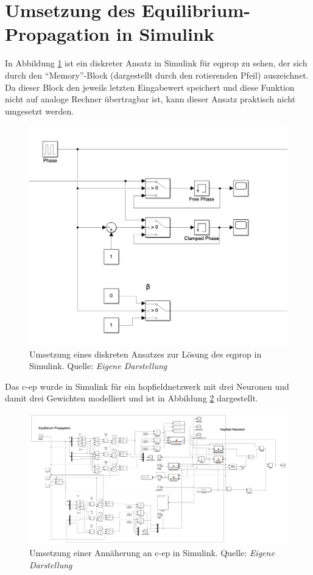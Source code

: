 \section{Umsetzung des Equilibrium-Propagation in Simulink}
\label{app:Umsetzung des Equilibrium-Propagation in Simulink}

In Abbildung \ref{fig:EqProp Discrete Simulink} ist ein diskreter Ansatz in Simulink für \gls{eqprop} zu sehen, der sich durch den "`Memory"'-Block (dargestellt durch den rotierenden Pfeil) auszeichnet. Da dieser Block den jeweils letzten Eingabewert speichert und diese Funktion nicht auf analoge Rechner übertragbar ist, kann dieser Ansatz praktisch nicht umgesetzt werden.

\begin{figure}[h]
  \includegraphics[width=\textwidth]{abbildungen/ep_discrete_simulink.png}
  \caption{Umsetzung eines diskreten Ansatzes zur Lösung des \gls{eqprop} in Simulink. Quelle: \textit{Eigene Darstellung}}
  \label{fig:EqProp Discrete Simulink}
\end{figure}

Das \gls{c-ep} wurde in Simulink für ein \gls{hopfieldnetzwerk} mit drei Neuronen und damit drei Gewichten modelliert und ist in Abbildung \ref{fig:C-EP Simulink} dargestellt.

\begin{figure}[h]
  \includegraphics[width=\textwidth]{abbildungen/c-ep_simulink.png}
  \caption{Umsetzung einer Annäherung an \gls{c-ep} in Simulink. Quelle: \textit{Eigene Darstellung}}
  \label{fig:C-EP Simulink}
\end{figure}

